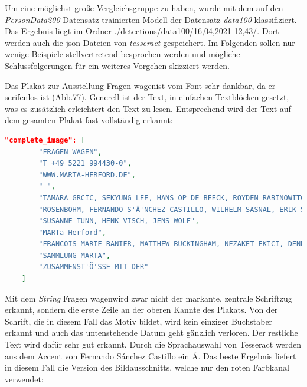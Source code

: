 \documentclass[a4paper,12pt,ngerman]{article}
\begin{document}
Um eine möglichst große Vergleichsgruppe zu haben, wurde mit dem auf den \textit{PersonData200} Datensatz trainierten Modell der Datensatz \textit{data100} klassifiziert. Das Ergebnis liegt im Ordner \glqq./detections/data100/16,04,2021-12,43/\grqq. Dort werden auch die json-Dateien von \textit{tesseract} gespeichert. Im Folgenden sollen nur wenige Beispiele stellvertretend besprochen werden und mögliche Schlussfolgerungen für ein weiteres Vorgehen skizziert werden.

Das Plakat zur Ausstellung \glqq Fragen wagen\grqq ist vom Font sehr dankbar, da er serifenlos ist (Abb.77). Generell ist der Text, in einfachen Textblöcken gesetzt, was es zusätzlich erleichtert den Text zu lesen. Entsprechend wird der Text auf dem gesamten Plakat fast vollständig erkannt:

\begin{lstlisting}[language=json,escapeinside='']
	"complete_image": [
        "FRAGEN WAGEN",
        "T +49 5221 994430-0",
        "WWW.MARTA-HERFORD.DE",
        " ",
        "TAMARA GRCIC, SEKYUNG LEE, HANS OP DE BEECK, ROYDEN RABINOWITCH, LARS",
		"ROSENBOHM, FERNANDO S'Ä'NCHEZ CASTILLO, WILHELM SASNAL, ERIK SCHMIDT,",
        "SUSANNE TUNN, HENK VISCH, JENS WOLF",
        "MARTa Herford",
        "FRANCOIS-MARIE BANIER, MATTHEW BUCKINGHAM, NEZAKET EKICI, DENNIS FESER,",
        "SAMMLUNG MARTA",
        "ZUSAMMENST'Ö'SSE MIT DER"
    ]
\end{lstlisting}

Mit dem \textit{String} \glqq Fragen wagen\grqq wird zwar nicht der markante, zentrale Schriftzug erkannt, sondern die erste Zeile an der oberen Kannte des Plakats. Von der Schrift, die in diesem Fall das Motiv bildet, wird kein einziger Buchstaber erkannt und auch das untenstehende Datum geht gänzlich verloren. Der restliche Text wird dafür sehr gut erkannt. Durch die Sprachauswahl von Tesseract werden aus dem Accent von Fernando Sánchez Castillo ein \glqq Ä\grqq. Das beste Ergebnis liefert in diesem Fall die Version des Bildausschnitts, welche nur den roten Farbkanal verwendet:
\end{document}
